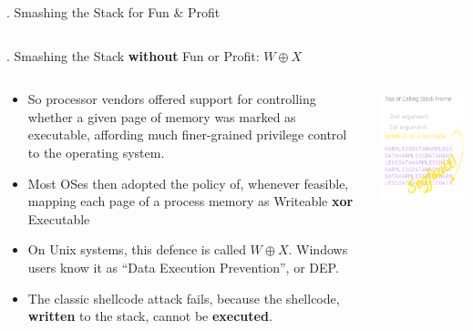 \documentclass[9pt]{beamer}
\begin{document}
\begin{frame}{\theframenumber. Smashing the Stack for Fun \& Profit}
\begin{columns}
\begin{column}{.5\textwidth}
    \end{column}
  \end{columns}
  
\end{frame}
\begin{frame}{\theframenumber. Smashing the Stack \textbf{without} Fun or Profit: $W\oplus X$}
  \begin{columns}
    \begin{column}{.5\textwidth}
      \begin{itemize}
      \item So processor vendors offered support for controlling whether a given page of memory was marked as executable, affording much finer-grained privilege control to the operating system.
       
      \item Most OSes then adopted the policy of, whenever feasible, mapping each page of a process memory as Writeable \textbf{xor} Executable
      \item On Unix systems, this defence is called $W\oplus X$. Windows users know it as ``Data Execution Prevention'', or DEP.
      \item The classic shellcode attack fails, because the shellcode, \textbf{written} to the stack, cannot be \textbf{executed}.
      \end{itemize}
    \end{column}
    \begin{column}{.5\textwidth}
      \includegraphics[width=\textwidth]{../images/stack_frame_attack_w^x.png}

\end{column}
\end{columns}
\end{frame}
\end{document}
